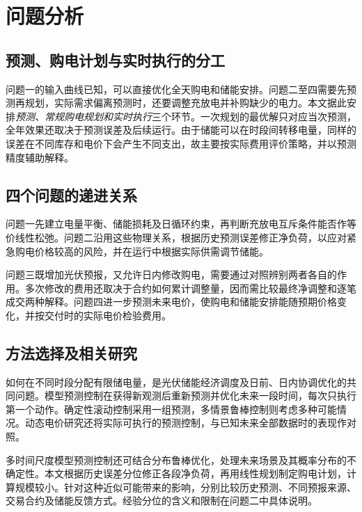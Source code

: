 \section{问题分析}
\subsection{预测、购电计划与实时执行的分工}
问题一的输入曲线已知，可以直接优化全天购电和储能安排。问题二至四需要先预测再规划，实际需求偏离预测时，还要调整充放电并补购缺少的电力。本文据此安排\emph{预测、常规购电规划和实时执行}三个环节。一次规划的最优解只对应当次预测，全年效果还取决于预测误差及后续运行。由于储能可以在时段间转移电量，同样的误差在不同库存和电价下会产生不同支出，故主要按实际费用评价策略，并以预测精度辅助解释。

\subsection{四个问题的递进关系}
问题一先建立电量平衡、储能损耗及日循环约束，再判断充放电互斥条件能否作等价线性松弛。问题二沿用这些物理关系，根据历史预测误差修正净负荷，以应对紧急购电价格较高的风险，并在运行中根据实际供需调节储能。

问题三既增加光伏预报，又允许日内修改购电，需要通过对照辨别两者各自的作用。多次修改的费用还取决于合约如何累计调整量，因而需比较最终净调整和逐笔成交两种解释。问题四进一步预测未来电价，使购电和储能安排能随预期价格变化，并按交付时的实际电价检验费用。

\subsection{方法选择及相关研究}

如何在不同时段分配有限储电量，是光伏储能经济调度及日前、日内协调优化的共同问题。模型预测控制在获得新观测后重新预测并优化未来一段时间，每次只执行第一个动作。确定性滚动控制采用一组预测，多情景鲁棒控制则考虑多种可能情况。动态电价研究还将实际可执行的预测控制，与已知未来全部数据时的表现作对照。

多时间尺度模型预测控制还可结合分布鲁棒优化，处理未来场景及其概率分布的不确定性。本文根据历史误差分位修正各段净负荷，再用线性规划制定购电计划，计算规模较小。针对这种近似可能带来的影响，分别比较历史预测、不同预报来源、交易合约及储能反馈方式。经验分位的含义和限制在问题二中具体说明。
